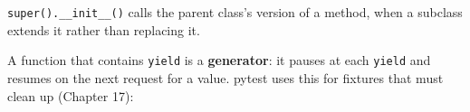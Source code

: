 \noindent{}\texttt{super().\_\_init\_\_()} calls the parent class's version of a method, when a subclass extends it rather than replacing it.

\label{44-appendices:g10-generators-and-yield}

A function that contains \texttt{yield} is a \textbf{generator}: it pauses at each \texttt{yield} and resumes on the next request for a value. pytest uses this for fixtures that must clean up (Chapter 17):

\begin{codebox}[short]

\begin{Shaded}
\begin{Highlighting}[]
\OperatorTok{=}
\end{Highlighting}
\end{Shaded}

\end{codebox}

\label{44-appendices:g11-the-standard-library-the-book-leans-on}

